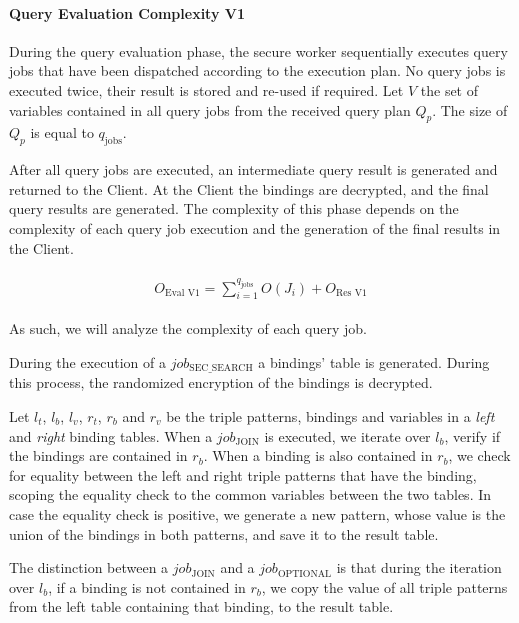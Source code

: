 \paragraph{Query Evaluation Complexity V1}

During the query evaluation phase, the secure worker sequentially executes query jobs that have been dispatched according to the execution plan. No query jobs is executed twice, their result is stored and re-used if required. Let $V$ the set of variables contained in all query jobs from the received query plan $Q_p$. The size of $Q_p$ is equal to $q_{\text{jobs}}$.

After all query jobs are executed, an intermediate query result is generated and returned to the Client. At the Client the bindings are decrypted, and the final query results are generated. The complexity of this phase depends on the complexity of each query job execution and the generation of the final results in the Client.

\begin{align}
    \label{equation:query-evaluation-v1}
    \begin{split}
        O_{\text{Eval V1}} = \sum_{i=1}^{q_{\text{jobs}}} O(J_i) + O_{\text{Res V1}}
    \end{split}
\end{align}

As such, we will analyze the complexity of each query job. 

During the execution of a $job_{\text{SEC\_SEARCH}}$ a bindings' table is generated. During this process, the randomized encryption of the bindings is decrypted. 

Let $l_t$, $l_b$, $l_v$, $r_t$, $r_b$ and $r_v$ be the triple patterns, bindings and variables in a \emph{left} and \emph{right} binding tables. When a $job_{\text{JOIN}}$ is executed, we iterate over $l_b$, verify if the bindings are  contained in $r_b$. When a binding is also contained in $r_b$, we check for equality between the left and right triple patterns that have the binding, scoping the equality check to the common variables between the two tables. In case the equality check is positive, we generate a new pattern, whose value is the union of the bindings in both patterns, and save it to the result table.

The distinction between a $job_{\text{JOIN}}$ and a $job_{\text{OPTIONAL}}$ is that during the iteration over $l_b$, if a binding is not contained in $r_b$, we copy the value of all triple patterns from the left table containing that binding, to the result table.

